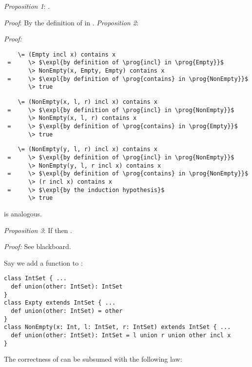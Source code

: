 {\emph{Proposition 1}: .

\emph{Proof}: By the definition of  in .
\es\bs
\emph{Proposition 2}: 

\emph{Proof:}

\begin{lstlisting}
    \= (Empty incl x) contains x
 =     \> $\expl{by definition of \prog{incl} in \prog{Empty}}$
       \> NonEmpty(x, Empty, Empty) contains x
 =     \> $\expl{by definition of \prog{contains} in \prog{NonEmpty}}$
       \> true
\end{lstlisting}

\begin{lstlisting}
    \= (NonEmpty(x, l, r) incl x) contains x
 =     \> $\expl{by definition of \prog{incl} in \prog{NonEmpty}}$
       \> NonEmpty(x, l, r) contains x
 =     \> $\expl{by definition of \prog{contains} in \prog{Empty}}$
       \> true
\end{lstlisting}
\es\bs
{}
\begin{lstlisting}
    \= (NonEmpty(y, l, r) incl x) contains x
 =     \> $\expl{by definition of \prog{incl} in \prog{NonEmpty}}$
       \> NonEmpty(y, l, r incl x) contains x
 =     \> $\expl{by definition of \prog{contains} in \prog{NonEmpty}}$
       \> (r incl x) contains x
 =     \> $\expl{by the induction hypothesis}$
       \> true
\end{lstlisting}

 is analogous.

\bigskip

\emph{Proposition 3}: If  then
.

\emph{Proof:} See blackboard.
\es
{}

Say we add a  function to :

\begin{lstlisting}
class IntSet { ...
  def union(other: IntSet): IntSet
}
class Expty extends IntSet { ...
  def union(other: IntSet) = other
}
class NonEmpty(x: Int, l: IntSet, r: IntSet) extends IntSet { ...
  def union(other: IntSet): IntSet = l union r union other incl x
}
\end{lstlisting}

The correctness of  can be subsumed with the following
law:

}
